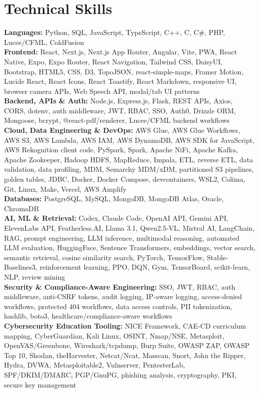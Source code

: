 \documentclass[letterpaper,10pt]{article}
\begin{document}
\section{Technical Skills}
\textbf{Languages:} Python, SQL, JavaScript, TypeScript, C++, C, C\#, PHP, Lucee/CFML, ColdFusion\\
\textbf{Frontend:} React, Next.js, Next.js App Router, Angular, Vite, PWA, React Native, Expo, Expo Router, React Navigation, Tailwind CSS, DaisyUI, Bootstrap, HTML5, CSS, D3, TopoJSON, react-simple-maps, Framer Motion, Lucide React, React Icons, React Toastify, React Markdown, responsive UI, browser camera APIs, Web Speech API, modal/tab UI patterns\\
\textbf{Backend, APIs \& Auth:} Node.js, Express.js, Flask, REST APIs, Axios, CORS, dotenv, auth middleware, JWT, RBAC, SSO, Auth0, Drizzle ORM, Mongoose, bcrypt, @react-pdf/renderer, Lucee/CFML backend workflows\\
\textbf{Cloud, Data Engineering \& DevOps:} AWS Glue, AWS Glue Workflows, AWS S3, AWS Lambda, AWS IAM, AWS DynamoDB, AWS SDK for JavaScript, AWS Rekognition client code, PySpark, Spark, Apache NiFi, Apache Kafka, Apache Zookeeper, Hadoop HDFS, MapReduce, Impala, ETL, reverse ETL, data validation, data profiling, MDM, Semarchy MDM/xDM, partitioned S3 pipelines, golden tables, JDBC, Docker, Docker Compose, devcontainers, WSL2, Colima, Git, Linux, Make, Vercel, AWS Amplify\\
\textbf{Databases:} PostgreSQL, MySQL, MongoDB, MongoDB Atlas, Oracle, ChromaDB\\
\textbf{AI, ML \& Retrieval:} Codex, Claude Code, OpenAI API, Gemini API, ElevenLabs API, Featherless.AI, Llama 3.1, Qwen2.5-VL, Mistral AI, LangChain, RAG, prompt engineering, LLM inference, multimodal reasoning, automated LLM evaluation, HuggingFace, Sentence Transformers, embeddings, vector search, semantic retrieval, cosine similarity search, PyTorch, TensorFlow, Stable-Baselines3, reinforcement learning, PPO, DQN, Gym, TensorBoard, scikit-learn, NLP, review mining\\
\textbf{Security \& Compliance-Aware Engineering:} SSO, JWT, RBAC, auth middleware, anti-CSRF tokens, audit logging, IP-aware logging, access-denied workflows, protected 404 workflows, data access controls, PII tokenization, hashlib, boto3, healthcare/compliance-aware workflows\\
\textbf{Cybersecurity Education Tooling:} NICE Framework, CAE-CD curriculum mapping, CyberGuardian, Kali Linux, OSINT, Nmap/NSE, Metasploit, OpenVAS/Greenbone, Wireshark/tcpdump, Burp Suite, OWASP ZAP, OWASP Top 10, Shodan, theHarvester, Netcat/Ncat, Masscan, Snort, John the Ripper, Hydra, DVWA, Metasploitable2, Vulnserver, PentesterLab, SPF/DKIM/DMARC, PGP/GnuPG, phishing analysis, cryptography, PKI, secure key management
\end{document}
